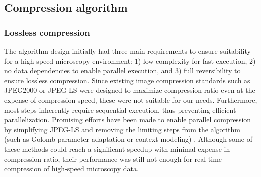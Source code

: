 


    


    

  \subsection{Compression algorithm}


    
    \subsubsection{Lossless compression}
    The algorithm design initially had three main requirements to ensure suitability for a high-speed microscopy environment: 1) low complexity for fast execution, 2) no data dependencies to enable parallel execution, and 3) full reversibility to ensure lossless compression. Since existing image compression standards such as JPEG2000 \cite{adams_jpeg-2000_2001} or JPEG-LS \cite{weinberger_loco-i_2000} were designed to maximize compression ratio even at the expense of compression speed, these were not suitable for our needs. Furthermore, most steps inherently require sequential execution, thus preventing efficient parallelization. Promising efforts have been made to enable parallel compression by simplifying JPEG-LS and removing the limiting steps from the algorithm (such as Golomb parameter adaptation or context modeling) \cite{wang_fast_2012,starosolski_simple_2007}. Although some of these methods could reach a significant speedup with minimal expense in compression ratio, their performance was still not enough for real-time compression of high-speed microscopy data.

